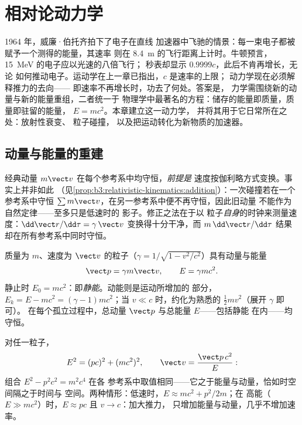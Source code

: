 \chapter{相对论动力学}\label{ch:b3:relativistic-dynamics}

1964 年，威廉·伯托齐拍下了电子在直线
加速器中飞驰的情景：每一束电子都被赋予一个测得的能量，其速率
则在 \qty{8.4}{m} 的飞行距离上计时。牛顿预言，
\qty{15}{MeV} 的电子应以光速的八倍飞行；
秒表却显示 $0.9999c$，此后不肯再增长，无论
如何推动电子。运动学在上一章已指出，$c$ 是速率的上限；
动力学现在必须解释推力的去向——
即速率不再增长时，功去了何处。答案是，
力学需围绕新的动量与新的能量重组，二者统一于
物理学中最著名的方程：储存的能量即质量，质量即驻留的能量，
$E = mc^2$。本章建立这一动力学，
并将其用于它日常所在之处：放射性衰变、
粒子碰撞，
以及把运动转化为新物质的加速器。

\section{动量与能量的重建}

\begin{remark}\label{rem:b3:relativistic-dynamics:why}
经典动量 $m\vect v$ 在每个参考系中均守恒，\emph{前提是}
速度按伽利略方式变换。事实上并非如此
（见\cref{prop:b3:relativistic-kinematics:addition}）：一次碰撞若在一个参考系中守恒
$\sum m\vect v$，在另一参考系中便不再守恒，因此旧动量
不能作为自然定律——至多只是低速时的
影子。修正之法在于以
粒子\emph{自身}的时钟来测量速度：$\dd\vect r/\dd\tau =
\gamma\,\vect v$ 变换得十分干净，而 $m\,\dd\vect r/\dd\tau$ 结果
却在所有参考系中同时守恒。
\end{remark}

\begin{definition}[相对论动量与能量]\label{def:b3:relativistic-dynamics:momentum-energy}
质量为 $m$、速度为 $\vect v$ 的粒子（$\gamma = 1/\sqrt{1 -
v^2/c^2}$）具有动量与能量
\[
\vect p = \gamma m\vect v , \qquad
E = \gamma mc^2 .
\]
静止时 $E_0 = mc^2$：即\emph{静能}。动能则是运动所增加的
部分，$E_k = E - mc^2 = (\gamma - 1)mc^2$；当 $v
\ll c$ 时，约化为熟悉的 $\tfrac12 mv^2$（展开 $\gamma$ 即可）。
在每个孤立过程中，总动量 $\vect p$ 与总能量 $E$——包括静能
在内——均守恒。
\end{definition}

\begin{theorem}[能量–动量关系]\label{thm:b3:relativistic-dynamics:relation}
对任一粒子，
\[
E^2 = (pc)^2 + (mc^2)^2 ,
\qquad
\vect v = \frac{\vect p\,c^2}{E} :
\]
组合 $E^2 - p^2c^2 = m^2c^4$ 在各
参考系中取值相同——它之于能量与动量，恰如时空间隔之于时间与
空间。两种情形：低速时，$E \approx mc^2 + p^2/2m$；在
高能（$E \gg mc^2$）时，$E \approx pc$ 且 $v \to c$：加大推力，
只增加能量与动量，几乎不增加速率。
\end{theorem}


